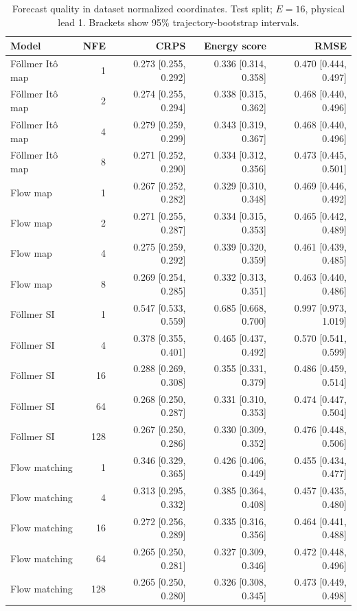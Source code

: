 \begin{table}[t]
\centering
\small
\setlength{\tabcolsep}{3pt}
\caption{Forecast quality in dataset normalized coordinates. Test split; $E=16$, physical lead 1. Brackets show 95\% trajectory-bootstrap intervals.}
\label{tab:map-quality}
\begin{tabular}{lrrrr}
\toprule
Model & NFE & CRPS & Energy score & RMSE \\
\midrule
Föllmer Itô map & 1 & 0.273 [0.255, 0.292] & 0.336 [0.314, 0.358] & 0.470 [0.444, 0.497] \\
Föllmer Itô map & 2 & 0.274 [0.255, 0.294] & 0.338 [0.315, 0.362] & 0.468 [0.440, 0.496] \\
Föllmer Itô map & 4 & 0.279 [0.259, 0.299] & 0.343 [0.319, 0.367] & 0.468 [0.440, 0.496] \\
Föllmer Itô map & 8 & 0.271 [0.252, 0.290] & 0.334 [0.312, 0.356] & 0.473 [0.445, 0.501] \\
\addlinespace
Flow map & 1 & 0.267 [0.252, 0.282] & 0.329 [0.310, 0.348] & 0.469 [0.446, 0.492] \\
Flow map & 2 & 0.271 [0.255, 0.287] & 0.334 [0.315, 0.353] & 0.465 [0.442, 0.489] \\
Flow map & 4 & 0.275 [0.259, 0.292] & 0.339 [0.320, 0.359] & 0.461 [0.439, 0.485] \\
Flow map & 8 & 0.269 [0.254, 0.285] & 0.332 [0.313, 0.351] & 0.463 [0.440, 0.486] \\
\addlinespace
Föllmer SI & 1 & 0.547 [0.533, 0.559] & 0.685 [0.668, 0.700] & 0.997 [0.973, 1.019] \\
Föllmer SI & 4 & 0.378 [0.355, 0.401] & 0.465 [0.437, 0.492] & 0.570 [0.541, 0.599] \\
Föllmer SI & 16 & 0.288 [0.269, 0.308] & 0.355 [0.331, 0.379] & 0.486 [0.459, 0.514] \\
Föllmer SI & 64 & 0.268 [0.250, 0.287] & 0.331 [0.310, 0.353] & 0.474 [0.447, 0.504] \\
Föllmer SI & 128 & 0.267 [0.250, 0.286] & 0.330 [0.309, 0.352] & 0.476 [0.448, 0.506] \\
\addlinespace
Flow matching & 1 & 0.346 [0.329, 0.365] & 0.426 [0.406, 0.449] & 0.455 [0.434, 0.477] \\
Flow matching & 4 & 0.313 [0.295, 0.332] & 0.385 [0.364, 0.408] & 0.457 [0.435, 0.480] \\
Flow matching & 16 & 0.272 [0.256, 0.289] & 0.335 [0.316, 0.356] & 0.464 [0.441, 0.488] \\
Flow matching & 64 & 0.265 [0.250, 0.281] & 0.327 [0.309, 0.346] & 0.472 [0.448, 0.496] \\
Flow matching & 128 & 0.265 [0.250, 0.280] & 0.326 [0.308, 0.345] & 0.473 [0.449, 0.498] \\
\bottomrule
\end{tabular}
\end{table}
